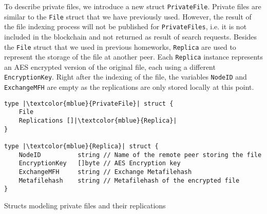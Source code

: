 \documentclass{article}
\begin{document}

To describe private files, we introduce a new struct \texttt{PrivateFile}. Private files are similar to the \texttt{File} struct that we have previously used. However, the result of the file indexing process will not be published for \texttt{PrivateFiles}, i.e. it is not included in the blockchain and not returned as result of search requests. 
Besides the \texttt{File} struct that we used in previous homeworks, \texttt{Replica} are used to represent the storage of the file at another peer. Each \texttt{Replica} instance represents an AES encrypted version of the original file, each using a different \texttt{EncryptionKey}. Right after the indexing of the file, the variables \texttt{NodeID} and \texttt{ExchangeMFH} are empty as the replications are only stored locally at this point. \\\vspace{0.5em}

\begin{listing}
\begin{verbatim}
type |\textcolor{mblue}{PrivateFile}| struct {
	File
	Replications []|\textcolor{mblue}{Replica}|
}

type |\textcolor{mblue}{Replica}| struct {
	NodeID          string // Name of the remote peer storing the file
	EncryptionKey   []byte // AES Encryption key
	ExchangeMFH     string // Exchange Metafilehash
	Metafilehash    string // Metafilehash of the encrypted file
}
\end{verbatim}
\caption{Structs modeling private files and their replications}
\end{listing}
\end{document}
